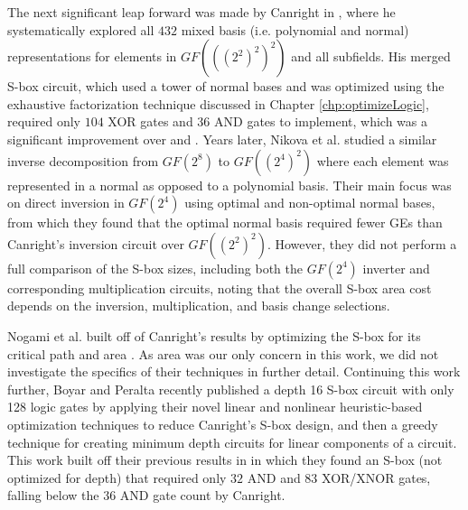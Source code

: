 The next significant leap forward was made by Canright in \cite{Canright05-1}, where he systematically explored all $432$ mixed basis (i.e. polynomial and normal) representations for elements in $GF(((2^2)^2)^2)$ and all subfields. His merged S-box circuit, which used a tower of normal bases and was optimized using the exhaustive factorization technique discussed in Chapter \ref{chp:optimizeLogic}, required only $104$ XOR gates and $36$ AND gates to implement, which was a significant improvement over \cite{Satoh01-1} and \cite{Mentens05-1}. Years later, Nikova et al. \cite{Nikova08-1} studied a similar inverse decomposition from $GF(2^8)$ to $GF((2^4)^2)$ where each element was represented in a normal as opposed to a polynomial basis. Their main focus was on direct inversion in $GF(2^4)$ using optimal and non-optimal normal bases, from which they found that the optimal normal basis required fewer GEs than Canright's inversion circuit over $GF((2^2)^2)$. However, they did not perform a full comparison of the S-box sizes, including both the $GF(2^4)$ inverter and corresponding multiplication circuits, noting that the overall S-box area cost depends on the inversion, multiplication, and basis change selections. 

Nogami et al. built off of Canright's results by optimizing the S-box for its critical path and area \cite{Nogami11-1}. As area was our only concern in this work, we did not investigate the specifics of their techniques in further detail. Continuing this work further, Boyar and Peralta \cite{Boyar11-1} recently published a depth 16 S-box circuit with only 128 logic gates by applying their novel linear and nonlinear heuristic-based optimization techniques to reduce Canright's S-box design, and then a greedy technique for creating minimum depth circuits for linear components of a circuit. This work built off their previous results in \cite{Boyar12-1, Boyar10-1} in which they found an S-box (not optimized for depth) that required only $32$ AND and $83$ XOR/XNOR gates, falling below the $36$ AND gate count by Canright. 

